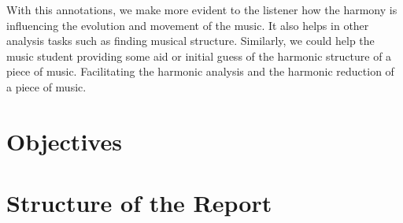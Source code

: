 With this annotations, we make more evident to the listener how the harmony is influencing the evolution and movement of the music. It also helps in other analysis tasks such as finding musical structure. Similarly, we could help the music student providing some aid or initial guess of the harmonic structure of a piece of music. Facilitating the harmonic analysis and the harmonic reduction of a piece of music.

\section{Objectives}
\section{Structure of the Report}


\newpage


